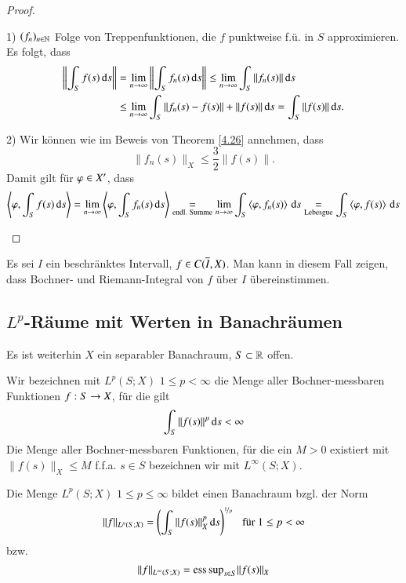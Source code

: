 \begin{proof}
    \begin{description}
    \item{1)}
    $(f_n)_{n\in \mathbb{N}}$ Folge von Treppenfunktionen, die $f$ punktweise f.ü. in $S$ approximieren.
    Es folgt, dass
    \begin{align*}
        \left\| \int_Sf(s)\, \mathrm{d} s\right\| &=\lim_{n\rightarrow\infty} \left\| \int_Sf_n(s) \, \mathrm{d} s\right\|
        \leq \lim_{n\rightarrow \infty} \int_S\|f_n(s)\| \, \mathrm{d} s\\
        &\leq \lim_{n\rightarrow \infty} \int_S \|f_n(s)-f(s)\| +\|f(s)\|\, \mathrm{d} s = \int_S \|f(s)\| \, \mathrm{d} s.
    \end{align*}
    \item{2)}
    Wir können wie im Beweis von Theorem \ref{4.26} annehmen, dass
    \[
        \|f_n(s)\|_X \leq \frac32 \|f(s)\|.
    \]
    Damit gilt für $\varphi \in X'$, dass
    \[
        \left\langle \varphi, \int_S f(s)\, \mathrm{d} s\right\rangle = \lim_{n\rightarrow \infty} \left\langle \varphi , \int_S f_n(s)\, \mathrm{d} s\right\rangle 
        \underset{\text{endl. Summe}}{=} \lim_{n\rightarrow \infty} \int_S \left\langle \varphi, f_n(s)\right\rangle \, \mathrm{d} s
        \underset{\text{Lebesgue}}{=} \int_S \left\langle \varphi, f(s)\right\rangle \, \mathrm{d} s
    \]
    \end{description}
    \[ \]
\end{proof}

\begin{remark}
    Es sei $I$ ein beschränktes Intervall, $f\in C(\overline I, X)$. Man kann in diesem Fall zeigen, dass
    Bochner- und Riemann-Integral von $f$ über $I$ übereinstimmen.
\end{remark}

\subsection*{$L^p$-Räume mit Werten in Banachräumen}

Es ist weiterhin $X$ ein separabler Banachraum, $S\subset \mathbb{R}$ offen.

\begin{defi}\label{4.28}
    Wir bezeichnen mit $L^p(S;X)$ $1\leq p<\infty$ die Menge aller Bochner-messbaren Funktionen
    $f:S\rightarrow X$, für die gilt
    \[
        \int_S \|f(s)\|^p \, \mathrm{d} s < \infty
    \]
    Die Menge aller Bochner-messbaren Funktionen, für die ein $M>0$ existiert mit $\|f(s)\|_X\leq M$ 
    f.f.a. $s\in S$ bezeichnen wir mit $L^\infty(S;X)$.
\end{defi}

\begin{theorem}\label{4.29}
    Die Menge $L^p(S;X)$ $1\leq p \leq \infty$ bildet einen Banachraum bzgl. der Norm
    \[
        \|f\|_{L^p(S;X)} = \left( \int_S \|f(s)\|_X^p\, \mathrm{d} s \right)^{\nicefrac1p} \hspace{.25cm} \text{für } 1\leq p 
        <\infty
    \]
    bzw. 
    \[
        \|f\|_{L^\infty(S;X)}=\mathrm{ess\, sup}_{s\in S} \|f(s)\|_X
    \]
\end{theorem}

